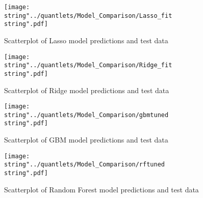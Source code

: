 \begin{figure}[H]
\centering
	\texttt{[image: \\string"../quantlets/Model\_Comparison/Lasso\_fit\\string".pdf]}
  	\caption{Scatterplot of Lasso model predictions and test data}
  	\label{fig:Lasso}
\end{figure}

\begin{figure}[H]
\centering
	\texttt{[image: \\string"../quantlets/Model\_Comparison/Ridge\_fit\\string".pdf]}
  	\caption{Scatterplot of Ridge model predictions and test data}
  	\label{fig:Ridge}
\end{figure}

\begin{figure}[H]
\centering
	\texttt{[image: \\string"../quantlets/Model\_Comparison/gbmtuned\\string".pdf]}
  	\caption{Scatterplot of GBM model predictions and test data}
  	\label{fig:gbm}
\end{figure}

\begin{figure}[H]
\centering
	\texttt{[image: \\string"../quantlets/Model\_Comparison/rftuned\\string".pdf]}
  	\caption{Scatterplot of Random Forest model predictions and test data}
  	\label{fig:rf}
\end{figure}



